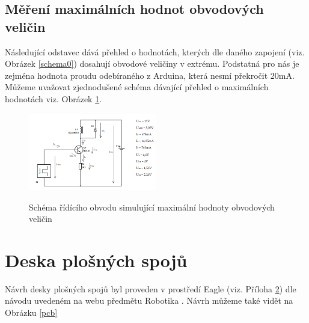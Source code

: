 \documentclass[12pt,oneside]{book} %
\begin{document}
\section{Měření maximálních hodnot obvodových veličin}
\qquad Následující odstavec dává přehled o hodnotách, kterých dle daného zapojení (viz. Obrázek \ref{schema0}) dosahují obvodové veličiny v extrému. Podstatná pro nás je zejména hodnota proudu odebíraného z Arduina, která nesmí překročit 20mA. Můžeme uvažovat zjednodušené schéma dávající přehled o maximálních hodnotách viz. Obrázek \ref{schema2}.

\begin{figure}[ht] \large\centering
\includegraphics[width=0.50\textwidth]{./img/schema2.png}\\[1cm] 
\caption{Schéma řídícího obvodu simulující maximální hodnoty obvodových veličin}
\label{schema2}
\end{figure} 

\chapter{Deska plošných spojů}\label{elektro_deska}
\qquad Návrh desky plošných spojů byl proveden v prostředí Eagle (viz. Příloha \hyperref[Prilohy]{2}) dle návodu uvedeném na webu předmětu Robotika \cite{robotika}. Návrh můžeme také vidět na Obrázku \ref{pcb}
\end{document}
